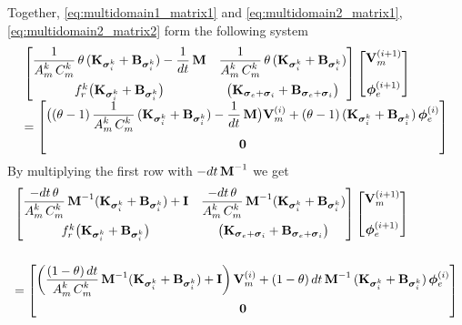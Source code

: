 Together, \eqref{eq:multidomain1_matrix1} and \eqref{eq:multidomain2_matrix1},\eqref{eq:multidomain2_matrix2} form the following system
\begin{equation}\label{eq:matrix_equation_1}
  \begin{array}{lll}
    \matt{
      \dfrac{1}{A_m^k\,C_m^k}\theta\,(\bfK_{\bfsigma_i^k} + \bfB_{\bfsigma_i^k}) -\dfrac{1}{dt}\bfM &
      \dfrac{1}{A_m^k\,C_m^k}\theta\,(\bfK_{\bfsigma_i^k} + \bfB_{\bfsigma_i^k}) \\[4mm]
      f_r^k \big(\bfK_{\bfsigma_i^k} + \bfB_{\bfsigma_i^k}\big) &
      \big(\bfK_{\bfsigma_e + \bfsigma_i} + \bfB_{\bfsigma_e + \bfsigma_i}\big)
    }
    \matt{
      \bfV_m^{(i+1)}\\[4mm]
       \bfphi_{e}^{(i+1)}
    }\\[4mm]
    = 
    \matt{
      \big((\theta-1)\, \dfrac{1}{A_m^k\,C_m^k}(\bfK_{\bfsigma_i^k} + \bfB_{\bfsigma_i^k}) - \dfrac{1}{dt}\bfM\big) \bfV_m^{(i)} 
      + (\theta - 1)\,(\bfK_{\bfsigma_i^k} + \bfB_{\bfsigma_i^k})\,\bfphi_e^{(i)}\\[4mm]
      \bfzero
    }
  \end{array}
\end{equation}
By multiplying the first row with $-dt\,\bfM^{-1}$ we get
\begin{equation}\label{eq:matrix_equation_2}
  \begin{array}{lll}
    \matt{
      \dfrac{-dt\,\theta}{A_m^k\,C_m^k}\bfM^{-1}(\bfK_{\bfsigma_i^k} + \bfB_{\bfsigma_i^k}) + \bfI &
      \dfrac{-dt\,\theta}{A_m^k\,C_m^k}\bfM^{-1}(\bfK_{\bfsigma_i^k} + \bfB_{\bfsigma_i^k}) \\[4mm]
      f_r^k \big(\bfK_{\bfsigma_i^k} + \bfB_{\bfsigma_i^k}\big) &
      \big(\bfK_{\bfsigma_e + \bfsigma_i} + \bfB_{\bfsigma_e + \bfsigma_i}\big)
    }
    \matt{
      \bfV_m^{(i+1)}\\[4mm]
       \bfphi_{e}^{(i+1)}
    }\\[12mm]
    = 
    \matt{
      \left(\dfrac{(1-\theta)\,dt}{A_m^k\,C_m^k}\bfM^{-1}(\bfK_{\bfsigma_i^k} + \bfB_{\bfsigma_i^k}) + \bfI\right) \bfV_m^{(i)}
      + (1 - \theta)\,dt\,\bfM^{-1}\,(\bfK_{\bfsigma_i^k} + \bfB_{\bfsigma_i^k})\,\bfphi_e^{(i)} \\[4mm]
      \bfzero
    }
  \end{array}
\end{equation}

